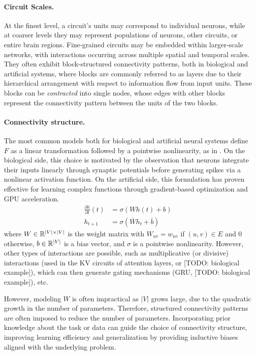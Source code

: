 \paragraph{Circuit Scales.}
At the finest level, a circuit's units may correspond to individual neurons, while at coarser levels they may represent populations of neurons, other circuits, or entire brain regions. Fine-grained circuits may be embedded within larger-scale networks, with interactions occurring across multiple spatial and temporal scales. They often exhibit block-structured connectivity patterns, both in biological and artificial systems, where blocks are commonly referred to as layers due to their hierarchical arrangement with respect to information flow from input units. These blocks can be \emph{contracted} into single nodes, whose edges with other blocks represent the connectivity pattern between the units of the two blocks.

\paragraph{Connectivity structure.}
The most common models both for biological and artificial neural systems define $F$ as a linear transformation followed by a pointwise nonlinearity, as in . On the biological side, this choice is motivated by the observation that neurons integrate their inputs linearly through synaptic potentials before generating spikes via a nonlinear activation function. On the artificial side, this formulation has proven effective for learning complex functions through gradient-based optimization and GPU acceleration.
\begin{align}
\label{eq:neural_circuit:continuous_linear}
\frac{ \partial h}{\partial t}(t) &= \sigma\left(W h(t) + b \right)\\
\label{eq:neural_circuit:discrete_linear}
h_{t+1} &= \sigma\left(\overline{W} h_t + \overline{b}\right)
\end{align}
where $W \in \mathbb{R}^{|V| \times |V|}$ is the weight matrix with $W_{uv} = w_{uv}$ if $(u,v) \in E$ and $0$ otherwise, $b \in \mathbb{R}^{|V|}$ is a bias vector, and $\sigma$ is a pointwise nonlinearity. However, other types of interactions are possible, such as multiplicative (or divisive) interactions (used in the KV circuits of attention layers, or [TODO: biological example]), which can then generate gating mechanisms (GRU, [TODO: biological example]), etc.

However, modeling $W$ is often impractical as $|V|$ grows large, due to the quadratic growth in the number of parameters. Therefore, structured connectivity patterns are often imposed to reduce the number of parameters. Incorporating prior knowledge about the task or data can guide the choice of connectivity structure, improving learning efficiency and generalization by providing inductive biases aligned with the underlying problem.

